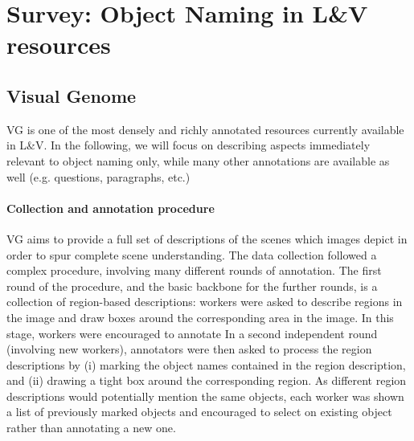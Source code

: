 \documentclass[10pt, a4paper]{article}
\newcommand{\vg}{VG\xspace}
\begin{document}
\section{Survey: Object Naming in L\&V resources}


\subsection{Visual Genome}

\vg \cite{krishna2016visualgenome} is one of the most densely and richly annotated resources currently available in L\&V. In the following, we will focus on describing aspects immediately relevant to object naming only, while many other annotations are available as well (e.g. questions, paragraphs, etc.)

\paragraph{Collection and annotation procedure}

\vg aims to provide a full set of descriptions of the scenes which images depict in order to spur complete scene understanding. 
The data collection followed a complex procedure, involving many different rounds of annotation. The first round of the procedure, and the basic backbone for the further rounds, is a collection of region-based descriptions: workers were asked to describe regions in the image and draw boxes around the corresponding area in the image. In this stage, workers were encouraged to annotate 
In a second independent round (involving new workers), annotators were then asked to process the region descriptions by (i) marking the object names contained in the region description, and (ii) drawing a tight box around the corresponding region. As different region descriptions would potentially mention the same objects, each worker was shown a list of previously marked objects and encouraged to select on existing object rather than annotating a new one.
\end{document}
